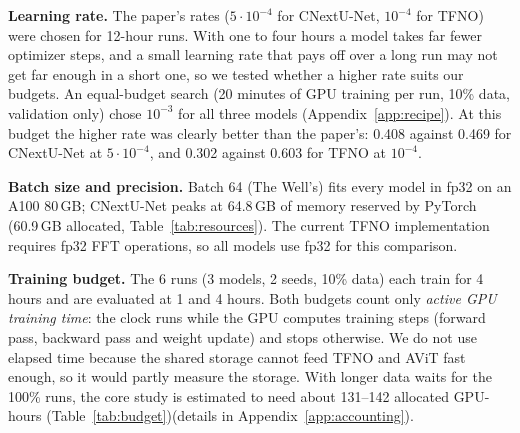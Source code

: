 \documentclass[11pt]{article}
\begin{document}
\textbf{Learning rate.} The paper's rates ($5\cdot10^{-4}$ for CNextU-Net, $10^{-4}$ for TFNO) were chosen for
12-hour runs. With one to four hours a model takes far fewer optimizer steps, and a small learning rate that pays off
over a long run may not get far enough in a short one, so we tested whether a higher rate suits our budgets. An
equal-budget search (20 minutes of GPU training per run, 10\% data, validation only) chose $10^{-3}$ for all three
models (Appendix~\ref{app:recipe}). At this budget the higher rate was clearly better than the paper's: 0.408 against 0.469
for CNextU-Net at $5\cdot10^{-4}$, and 0.302 against 0.603 for TFNO at $10^{-4}$. 


\textbf{Batch size and precision.} Batch 64 (The Well's) fits every model in fp32 on an A100 80\,GB; CNextU-Net
peaks at 64.8\,GB of memory reserved by PyTorch (60.9\,GB allocated, Table~\ref{tab:resources}). The current TFNO
implementation requires fp32 FFT operations, so all models use fp32 for this comparison. 

\textbf{Training budget.} The 6 runs (3 models, 2 seeds, 10\% data) each train for 4 hours and
are evaluated at 1 and 4 hours. Both budgets count only \emph{active GPU training time}:
the clock runs while the GPU computes training steps (forward pass, backward pass and weight update) and stops
otherwise. We do not use elapsed time because the
shared storage cannot feed TFNO and AViT fast enough, so it would partly measure the storage.
With longer data waits for the 100\% runs, the core study is estimated to need about 131--142
allocated GPU-hours (Table~\ref{tab:budget})(details in Appendix~\ref{app:accounting}).
\end{document}
